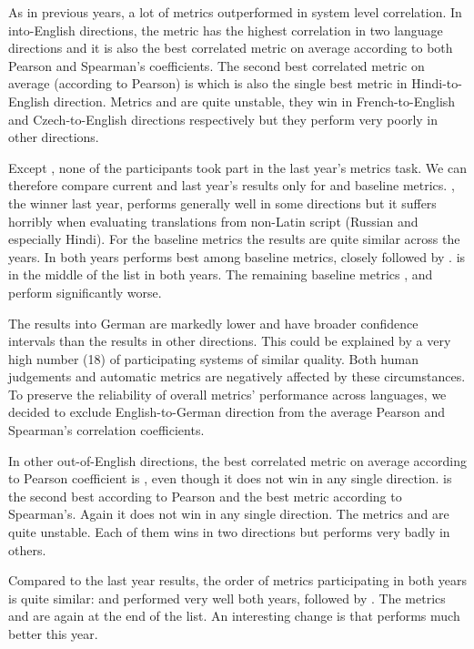 As in previous years, a lot of metrics outperformed  in system
level correlation. In into-English directions, the metric
 has the highest correlation in two language
directions and it is also the best correlated metric on average according to both
Pearson and Spearman's coefficients. The second best correlated metric on
average (according to Pearson) is  which is also the single
best metric in Hindi-to-English direction.  Metrics  and
 are quite unstable, they win in French-to-English and
Czech-to-English directions respectively but they perform very poorly in other
directions. 

Except , none of the participants took part in the last year's
metrics task.  We can therefore compare current and last year's results only for
 and baseline metrics.  , the winner last year,
performs generally well in some directions but it suffers horribly when
evaluating translations from non-Latin script (Russian and especially Hindi).
For the baseline metrics the results are quite similar across the years. In
both years  performs best among baseline metrics, closely followed
by .  is in the middle of the list in both
years. The remaining baseline metrics , 
and  perform significantly worse.

The results into German are markedly lower and have broader confidence
intervals than the results in other directions. This could be explained by a
very
high number (18) of participating systems of similar quality. 
Both human judgements and automatic metrics are negatively affected by these
circumstances. To preserve the reliability of overall metrics' performance
across languages, we
decided to exclude English-to-German
direction from the average Pearson and Spearman's correlation coefficients.

In other out-of-English directions, the best correlated metric on average according
to Pearson coefficient is , even though it does not win in any
single direction.  is the second best according to Pearson
and the best metric according to Spearman's. Again it does not win in any
single direction. The metrics  and  are quite
unstable.  Each of them wins in two directions but performs very badly in
others.

Compared to the last year results, the order of metrics participating in both
years is quite similar:  and  performed very well
both years, followed by . The metrics  and 
are again at the end of the list. An interesting change is that
 performs much better this year.


